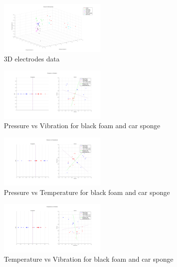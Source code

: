 \documentclass[10pt,twocolumn,letterpaper]{article}
\begin{document}
\begin{figure}[h]
\begin{center}
   \includegraphics[width=0.47\textwidth]{sec2_part2b}
\end{center}
   \caption{3D electrodes data}
\label{fig:16}
\end{figure}




\begin{figure}[h]
\begin{center}
   \includegraphics[width=0.47\textwidth]{sec3_part1a_1}
\end{center}
   \caption{Pressure vs Vibration for black foam and car sponge}
\label{fig:17}
\end{figure}

\begin{figure}[h]
\begin{center}
   \includegraphics[width=0.47\textwidth]{sec3_part1a_2}
\end{center}
   \caption{Pressure vs Temperature for black foam and car sponge}
\label{fig:18}
\end{figure}

\begin{figure}[h]
\begin{center}
   \includegraphics[width=0.47\textwidth]{sec3_part1a_3}
\end{center}
   \caption{Temperature vs Vibration for black foam and car sponge}
\label{fig:19}
\end{figure}
\end{document}
